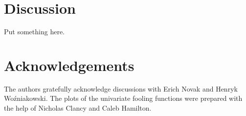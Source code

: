 \documentclass[graybox]{svmult}
\begin{document}
\section{Discussion}

Put something here.


\section*{Acknowledgements} The authors gratefully acknowledge discussions with Erich Novak and Henryk Wo\'zniakowski.  The plots of the univariate fooling functions were prepared with the help of Nicholas Clancy and Caleb Hamilton.



\end{document}
